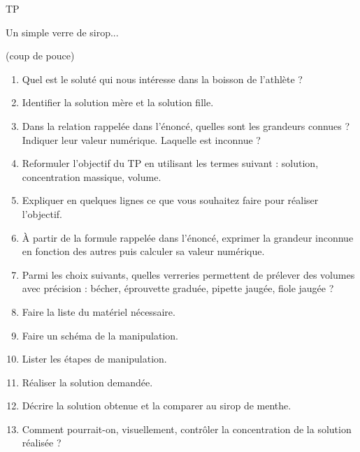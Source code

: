 
\cfoot{} %



\begin{header}
TP

Un simple verre de sirop...

(coup de pouce)
\end{header}

\begin{enumerate}
\item Quel est le soluté qui nous intéresse dans la boisson de l'athlète ?
\item Identifier la solution mère et la solution fille.
\item Dans la relation rappelée dans l'énoncé, quelles sont les grandeurs connues ?
Indiquer leur valeur numérique.
Laquelle est inconnue ?
\item Reformuler l'objectif du TP en utilisant les termes suivant : solution, concentration massique, volume.
\item Expliquer en quelques lignes ce que vous souhaitez faire pour réaliser l'objectif.
\item À partir de la formule rappelée dans l'énoncé, exprimer la grandeur inconnue en fonction des autres puis calculer sa valeur numérique.
\item Parmi les choix suivants, quelles verreries permettent de prélever des volumes avec précision : bécher, éprouvette graduée, pipette jaugée, fiole jaugée ?
\item Faire la liste du matériel nécessaire.
\item Faire un schéma de la manipulation.
\item Lister les étapes de manipulation.
\item Réaliser la solution demandée.
\item Décrire la solution obtenue et la comparer au sirop de menthe.
\item Comment pourrait-on, visuellement, contrôler la concentration de la solution réalisée ? 
\end{enumerate}

